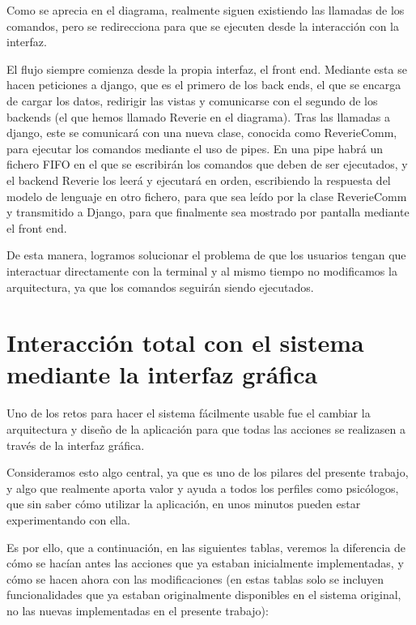Como se aprecia en el diagrama, realmente siguen existiendo las llamadas de los comandos, pero se redirecciona para que se ejecuten desde la interacción con la interfaz. 

El flujo siempre comienza desde la propia interfaz, el front end. Mediante esta se hacen peticiones a django, que es el primero de los back ends, el que se encarga de cargar los datos, redirigir las vistas y comunicarse con el segundo de los backends (el que hemos llamado Reverie en el diagrama). Tras las llamadas a django, este se comunicará con una nueva clase, conocida como ReverieComm, para ejecutar los comandos mediante el uso de pipes. En una pipe habrá un fichero FIFO en el que se escribirán los comandos que deben de ser ejecutados, y el backend Reverie los leerá y ejecutará en orden, escribiendo la respuesta del modelo de lenguaje en otro fichero, para que sea leído por la clase ReverieComm y transmitido a Django, para que finalmente sea mostrado por pantalla mediante el front end.

De esta manera, logramos solucionar el problema de que los usuarios tengan que interactuar directamente con la terminal y al mismo tiempo no modificamos la arquitectura, ya que los comandos seguirán siendo ejecutados. 

\section{Interacción total con el sistema mediante la interfaz gráfica}

Uno de los retos para hacer el sistema fácilmente usable fue el cambiar la arquitectura y diseño de la aplicación para que todas las acciones se realizasen a través de la interfaz gráfica.

Consideramos esto algo central, ya que es uno de los pilares del presente trabajo, y algo que realmente aporta valor y ayuda a todos los perfiles como psicólogos, que sin saber cómo utilizar la aplicación, en unos minutos pueden estar experimentando con ella.

Es por ello, que a continuación, en las siguientes tablas, veremos la diferencia de cómo se hacían antes las acciones que ya estaban inicialmente implementadas, y cómo se hacen ahora con las modificaciones (en estas tablas solo se incluyen funcionalidades que ya estaban originalmente disponibles en el sistema original, no las nuevas implementadas en el presente trabajo):


